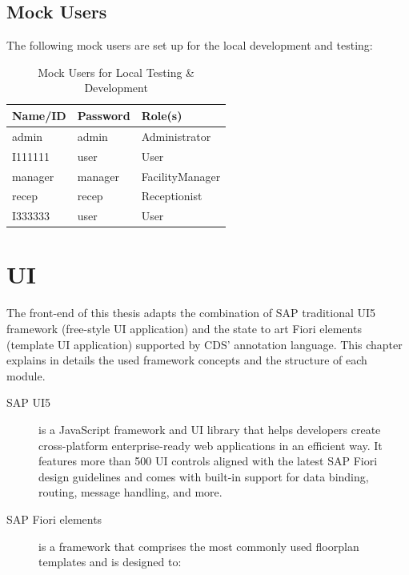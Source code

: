 \subsection{Mock Users}

The following mock users are set up for the local development and testing:

\begin{table}[H]
    \centering
    \begin{tabular}{|m{2.5cm}|m{2.5cm}|m{3.5cm}|} \hline 
        \textbf{Name/ID} & \textbf{Password} & \textbf{Role(s)} \\ \hline 
        admin & admin & Administrator \\ \hline 
        I111111 & user & User \\ \hline 
        manager & manager & FacilityManager \\ \hline 
        recep & recep & Receptionist \\ \hline 
        I333333 & user & User \\ \hline
    \end{tabular}
    \caption{Mock Users for Local Testing \& Development}
\end{table}

\section{UI}
\label{sec:D-UI}

The front-end of this thesis adapts the combination of SAP traditional UI5 framework (free-style UI application) and the state to art Fiori elements (template UI application) supported by CDS' annotation language. This chapter explains in details the used framework concepts and the structure of each module.

\begin{description}
	\item[SAP UI5] is a JavaScript framework and UI library that helps developers create cross-platform enterprise-ready web applications in an efficient way. It features more than 500 UI controls aligned with the latest SAP Fiori design guidelines and comes with built-in support for data binding, routing, message handling, and more. \cite{fiorielements}
 
	\item[SAP Fiori elements] is a framework that comprises the most commonly used floorplan templates and is designed to:
\end{description}

